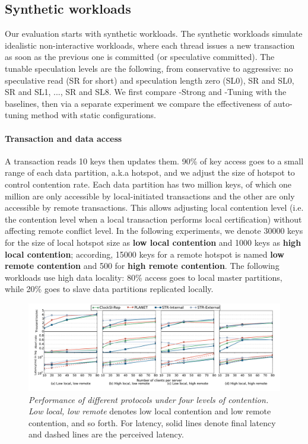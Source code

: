 \subsection{Synthetic workloads}
Our evaluation starts with synthetic workloads. The synthetic workloads simulate idealistic non-interactive workloads, where each thread issues a new transaction as soon as the previous one is committed (or speculative committed). The tunable speculation levels are the following, from conservative to aggressive: no speculative read (SR for short) and speculation length zero (SL0), SR and SL0, SR and SL1, ..., SR and SL8. We first compare {\specula}-Strong and {\specula}-Tuning with the baselines, then via a separate experiment we compare the effectiveness of auto-tuning method with static configurations.

\paragraph{Transaction and data access} A transaction reads 10 keys then updates them. 90\% of key access goes to a small range of each data partition, a.k.a hotspot, and we adjust the size of hotspot to control contention rate. Each data partition has two million keys, of which one million are only accessible by local-initiated transactions and the other are only accessible by remote transactions. This allows adjusting local contention level (i.e. the contention level when a local transaction performs local certification) without affecting remote conflict level. In the following experiments, we denote 30000 keys for the size of local hotspot size as \textbf{low local contention} and 1000 keys as \textbf{high local contention}; according, 15000 keys for a remote hotspot is named \textbf{low remote contention} and 500 for \textbf{high remote contention}. The following workloads use high data locality: 80\% access goes to local master partitions, while 20\% goes to slave data partitions replicated locally.

\begin{figure}
\centering
\def\svgwidth{0.98\columnwidth}
\includegraphics[scale=0.35]{figures/micro}
\hspace{-10mm}
\caption{\textit{Performance of different protocols under four levels of contention.} \textit{Low local, low remote} denotes low local contention and low remote contention, and so forth. For latency, solid lines denote final latency and dashed lines are the perceived latency.}
\label{fig:micro_conflict}
\end{figure}



